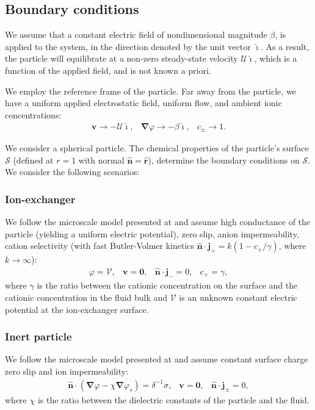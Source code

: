 \documentclass[MSc,beforeExam]{iitcsthesis}
\newcommand\bnabla{\boldsymbol{\nabla}}
\newcommand\bv{\boldsymbol{v}}
\newcommand\bn{\boldsymbol{\hat{n}}}
\newcommand\bj{\boldsymbol{j}}
\newcommand\br{\boldsymbol{r}}
\newcommand\brhat{\hat{\br}}
\newcommand\bzero{\boldsymbol{0}}
\newcommand\cU{\mathscr{U}}
\newcommand\cV{\mathscr{V}}
\newcommand\ui{\boldsymbol{\hat{\imath}}}
\begin{document}
\subsection{Boundary conditions}
We assume that a constant electric field of nondimensional magnitude $\beta$,
is applied to the system, in the direction denoted by the unit vector $\ui$.
As a result, the particle will equilibrate at 
a non-zero steady-state velocity $\cU \ui$, which is
a function of the applied field, and is not known a priori.

We employ the reference frame of the particle.
Far away from the particle, we have a uniform applied electrostatic field, uniform flow,
and ambient ionic concentrations:
\begin{equation}\label{eq:bndcond_inf}\begin{array}{ccc}
\bv \rightarrow -\cU \ui, &
\bnabla \varphi \rightarrow -\beta\ui, &
 c_\pm \rightarrow 1.
\end{array}\end{equation}

We consider a spherical particle.
The chemical properties of the particle's surface $\mathcal{S}$ (defined at $r=1$ 
with normal $\bn = \brhat$), determine the boundary conditions on $\mathcal{S}$.
We consider the following scenarios:
\subsubsection{Ion-exchanger}
We follow the microscale model presented at \cite{yariv2010migration}
and assume high conductance of the particle (yielding a uniform electric potential),
zero slip, anion impermeability, cation selectivity 
(with fast Butler-Volmer\cite{bard2000book} kinetics
$\bn \cdot \bj_+ = k (1 - c_+/\gamma)$, where $k \rightarrow \infty$):
\begin{equation}
\begin{array}{cccc}
\varphi = \cV, &
\bv = \bzero, &
\bn \cdot \bj_- = 0, &
c_+ = \gamma,
\end{array}
\end{equation}
where $\gamma$ is the ratio between the cationic concentration on the surface and the cationic
concentration in the fluid bulk and $\cV$ is an unknown constant electric potential at
the ion-exchanger surface. 

\subsubsection{Inert particle}
We follow the microscale model presented at \cite{schnitzer2012surface}
and assume constant surface charge
zero slip and ion impermeability:
\begin{equation}
\begin{array}{cccc}
\bn \cdot (\bnabla \varphi - \chi \bnabla \varphi_s) = \delta^{-1} \sigma, &
\bv = \bzero, &
\bn \cdot \bj_\pm = 0,
\end{array}
\end{equation}
where $\chi$ is the ratio between the dielectric constants of the 
particle and the fluid.
\end{document}
